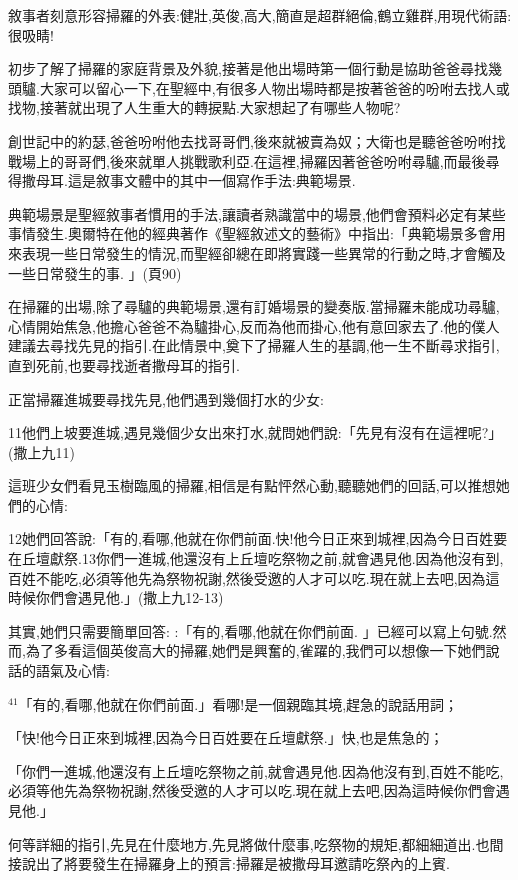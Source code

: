 \documentclass{book}
\begin{document}
敘事者刻意形容掃羅的外表:健壯,英俊,高大,簡直是超群絕倫,鶴立雞群,用現代術語:很吸睛!

初步了解了掃羅的家庭背景及外貌,接著是他出場時第一個行動是協助爸爸尋找幾頭驢.大家可以留心一下,在聖經中,有很多人物出場時都是按著爸爸的吩咐去找人或找物,接著就出現了人生重大的轉捩點.大家想起了有哪些人物呢?

創世記中的約瑟,爸爸吩咐他去找哥哥們,後來就被賣為奴；大衛也是聽爸爸吩咐找戰場上的哥哥們,後來就單人挑戰歌利亞.在這裡,掃羅因著爸爸吩咐尋驢,而最後尋得撒母耳.這是敘事文體中的其中一個寫作手法:典範場景.

典範場景是聖經敘事者慣用的手法,讓讀者熟識當中的場景,他們會預料必定有某些事情發生.奧爾特在他的經典著作《聖經敘述文的藝術》中指出:「典範場景多會用來表現一些日常發生的情況,而聖經卻總在即將實踐一些異常的行動之時,才會觸及一些日常發生的事. 」(頁90)

在掃羅的出場,除了尋驢的典範場景,還有訂婚場景的變奏版.當掃羅未能成功尋驢,心情開始焦急,他擔心爸爸不為驢掛心,反而為他而掛心,他有意回家去了.他的僕人建議去尋找先見的指引.在此情景中,奠下了掃羅人生的基調,他一生不斷尋求指引,直到死前,也要尋找逝者撒母耳的指引.

正當掃羅進城要尋找先見,他們遇到幾個打水的少女:

11他們上坡要進城,遇見幾個少女出來打水,就問她們說:「先見有沒有在這裡呢?」(撒上九11)

這班少女們看見玉樹臨風的掃羅,相信是有點怦然心動,聽聽她們的回話,可以推想她們的心情:

12她們回答說:「有的,看哪,他就在你們前面.快!他今日正來到城裡,因為今日百姓要在丘壇獻祭.13你們一進城,他還沒有上丘壇吃祭物之前,就會遇見他.因為他沒有到,百姓不能吃,必須等他先為祭物祝謝,然後受邀的人才可以吃.現在就上去吧,因為這時候你們會遇見他.」(撒上九12-13)

其實,她們只需要簡單回答: :「有的,看哪,他就在你們前面. 」已經可以寫上句號.然而,為了多看這個英俊高大的掃羅,她們是興奮的,雀躍的,我們可以想像一下她們說話的語氣及心情:


$^{41}$「有的,看哪,他就在你們前面.」看哪!是一個親臨其境,趕急的說話用詞；

「快!他今日正來到城裡,因為今日百姓要在丘壇獻祭.」快,也是焦急的；

「你們一進城,他還沒有上丘壇吃祭物之前,就會遇見他.因為他沒有到,百姓不能吃,必須等他先為祭物祝謝,然後受邀的人才可以吃.現在就上去吧,因為這時候你們會遇見他.」

何等詳細的指引,先見在什麼地方,先見將做什麼事,吃祭物的規矩,都細細道出.也間接說出了將要發生在掃羅身上的預言:掃羅是被撒母耳邀請吃祭內的上賓.
\end{document}
